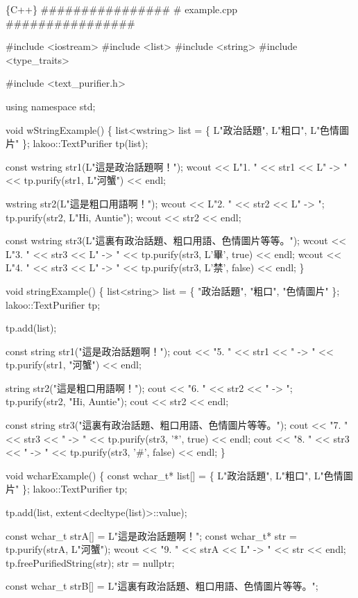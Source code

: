 \begin{DoxyCode}
\{C++\}
################
# example.cpp
################

#include <iostream>
#include <list>
#include <string>
#include <type\_traits>

#include <text\_purifier.h>


using namespace std;


void wStringExample()
\{
    list<wstring> list = \{ L"政治話題", L"粗口", L"色情圖片" \};
    lakoo::TextPurifier tp(list);

    const wstring str1(L"這是政治話題啊！");
    wcout << L"1.  " << str1 << L" -> " << tp.purify(str1, L"河蟹") << endl;

    wstring str2(L"這是粗口用語啊！");
    wcout << L"2.  " << str2 << L" -> ";
    tp.purify(str2, L"Hi, Auntie");
    wcout << str2 << endl;

    const wstring str3(L"這裏有政治話題、粗口用語、色情圖片等等。");
    wcout << L"3.  " << str3 << L" -> " << tp.purify(str3, L'畢', true) << endl;
    wcout << L"4.  " << str3 << L" -> " << tp.purify(str3, L'禁', false) << endl;
\}

void stringExample()
\{
    list<string> list = \{ "政治話題", "粗口", "色情圖片" \};
    lakoo::TextPurifier tp;

    tp.add(list);

    const string str1("這是政治話題啊！");
    cout << "5.  " << str1 << " -> " << tp.purify(str1, "河蟹") << endl;

    string str2("這是粗口用語啊！");
    cout << "6.  " << str2 << " -> ";
    tp.purify(str2, "Hi, Auntie");
    cout << str2 << endl;

    const string str3("這裏有政治話題、粗口用語、色情圖片等等。");
    cout << "7.  " << str3 << " -> " << tp.purify(str3, '*', true) << endl;
    cout << "8.  " << str3 << " -> " << tp.purify(str3, '#', false) << endl;
\}

void wcharExample()
\{
    const wchar\_t* list[] = \{ L"政治話題", L"粗口", L"色情圖片" \};
    lakoo::TextPurifier tp;

    tp.add(list, extent<decltype(list)>::value);

    const wchar\_t strA[] = L"這是政治話題啊！";
    const wchar\_t* str = tp.purify(strA, L"河蟹");
    wcout << "9.  " << strA << L" -> " << str << endl;
    tp.freePurifiedString(str);
    str = nullptr;

    const wchar\_t strB[] = L"這裏有政治話題、粗口用語、色情圖片等等。";


\end{DoxyCode}
